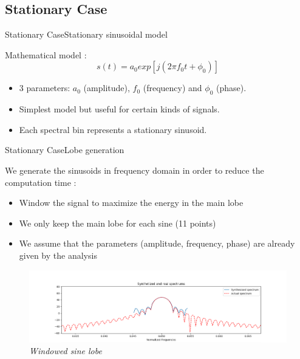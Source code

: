 \documentclass{bredelebeamer}
\begin{document}
\subsection{Stationary Case}
\begin{frame}{Stationary Case}{Stationary sinusoidal model}
\begin{block}{}
Mathematical model : \\

\begin{equation}
s(t) = a_0 exp[j(2 \pi f_0 t + \phi_0)]
\end{equation}
\end{block}
\begin{itemize}
\item 3 parameters: $a_0$ (amplitude), $f_0$ (frequency) and $\phi_0$ (phase).
\item Simplest model but useful for certain kinds of signals.
\item Each spectral bin represents a stationary sinusoid.
\end{itemize}

\end{frame}
\begin{frame}{Stationary Case}{Lobe generation}
\begin{block}{}
We generate the sinusoids in frequency domain in order to reduce the computation time : \\

\begin{itemize}
\item Window the signal to maximize the energy in the main lobe
\item We only keep the main lobe for each sine (11 points)
\item We assume that the parameters (amplitude, frequency, phase) are already given by the analysis
\end{itemize}
\end{block}
\begin{figure}
	\centerline
	{\includegraphics[scale=0.75]{lobe.png}}
	\caption{\it Windowed sine lobe}
\end{figure}
\end{frame}
\end{document}
